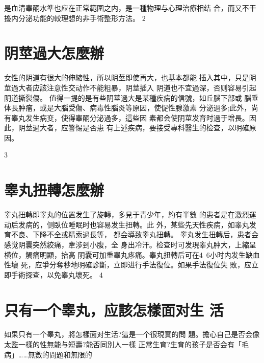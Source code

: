 \documentclass[12pt,UTF8]{ctexbook}
\begin{document}
是血清睾酮水準也应在正常範圍之内，是一種物理与心理治療相结
合，而又不干擾内分泌功能的較理想的非手術整形方法。
2
\section{阴莖過大怎麼辦}
女性的阴道有很大的伸縮性，所以阴莖即使再大，也基本都能
插入其中，只是阴莖過大者应該注意性交动作不能粗暴，阴莖插入
阴道也不宜過深，否则容易引起阴道撕裂傷。
值得一提的是有些阴莖過大是某種疾病的信號，如丘腦下部或
腦垂体長肿瘤，或是大腦受傷、病毒性腦炎等原因，使促性腺激素
分泌過多;此外，尚有睾丸发生病变，使得睾酮分泌過多，這些因
素都会使阴莖发育时過于增長。因此，阴莖過大者，应警惕是否患
有上述疾病，要接受專科醫生的检查，以明確原因。

3
\section{睾丸扭轉怎麼辦}
睾丸扭轉即睾丸的位置发生了旋轉，多見于青少年，約有半數
的患者是在激烈運动后发病的，侧臥位睡眠时也容易发生扭轉。此
外，某些先天性疾病，如睾丸发育不良、下降不全或精索過長等，
都会導致睾丸扭轉。
睾丸发生扭轉后，患者会感觉阴囊突然絞痛，牽涉到小腹，全
身出冷汗。检查时可发現睾丸肿大，上縮呈横位，觸痛明顯，抬高
阴囊可加重睾丸疼痛。睾丸扭轉后可在4~6小时内发生缺血性壞
死，应爭分奪秒地明確診斷，立即进行手法復位。如果手法復位失
敗，应立即手術探查，以免睾丸壞死。
4
\section{只有一个睾丸，应該怎樣面对生
活}
如果只有一个睾丸，將怎樣面对生活?這是一个很現實的問
題。擔心自己是否会像太監一樣的性無能与短壽?能否同別人一樣
正常生育?生育的孩子是否会有「毛病」……無數的問題和無限的
\end{document}
